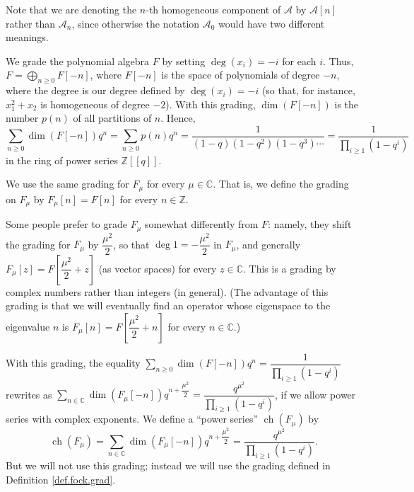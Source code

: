 \documentclass[etingof-lie.tex]{subfiles}
\begin{document}
Note that we are denoting the $n$-th homogeneous component of $\mathcal{A}$ by
$\mathcal{A}\left[  n\right]  $ rather than $\mathcal{A}_{n}$, since otherwise
the notation $\mathcal{A}_{0}$ would have two different meanings.

\begin{definition}
\label{def.fock.grad}We grade the polynomial algebra $F$ by setting
$\deg\left(  x_{i}\right)  =-i$ for each $i$. Thus, $F=\bigoplus
\limits_{n\geq0}F\left[  -n\right]  $, where $F\left[  -n\right]  $ is the
space of polynomials of degree $-n$, where the degree is our degree defined by
$\deg\left(  x_{i}\right)  =-i$ (so that, for instance, $x_{1}^{2}+x_{2}$ is
homogeneous of degree $-2$). With this grading, $\dim\left(  F\left[
-n\right]  \right)  $ is the number $p\left(  n\right)  $ of all partitions of
$n$. Hence,%
\[
\sum\limits_{n\geq0}\dim\left(  F\left[  -n\right]  \right)  q^{n}%
=\sum\limits_{n\geq0}p\left(  n\right)  q^{n}=\dfrac{1}{\left(  1-q\right)
\left(  1-q^{2}\right)  \left(  1-q^{3}\right)  \cdots}=\dfrac{1}%
{\prod\limits_{i\geq1}\left(  1-q^{i}\right)  }%
\]
in the ring of power series $\mathbb{Z}\left[  \left[  q\right]  \right]  $.

We use the same grading for $F_{\mu}$ for every $\mu\in\mathbb{C}$. That is,
we define the grading on $F_{\mu}$ by $F_{\mu}\left[  n\right]  =F\left[
n\right]  $ for every $n\in\mathbb{Z}$.
\end{definition}

\begin{remark}
\label{rmk.fockgrad}Some people prefer to grade $F_{\mu}$ somewhat differently
from $F$: namely, they shift the grading for $F_{\mu}$ by $\dfrac{\mu^{2}}{2}%
$, so that $\deg1=-\dfrac{\mu^{2}}{2}$ in $F_{\mu}$, and generally $F_{\mu
}\left[  z\right]  =F\left[  \dfrac{\mu^{2}}{2}+z\right]  $ (as vector spaces)
for every $z\in\mathbb{C}$. This is a grading by complex numbers rather than
integers (in general). (The advantage of this grading is that we will
eventually find an operator whose eigenspace to the eigenvalue $n$ is $F_{\mu
}\left[  n\right]  =F\left[  \dfrac{\mu^{2}}{2}+n\right]  $ for every
$n\in\mathbb{C}$.)

With this grading, the equality $\sum\limits_{n\geq0}\dim\left(  F\left[
-n\right]  \right)  q^{n}=\dfrac{1}{\prod\limits_{i\geq1}\left(
1-q^{i}\right)  }$ rewrites as $\sum\limits_{n\in\mathbb{C}}\dim\left(
F_{\mu}\left[  -n\right]  \right)  q^{n+\dfrac{\mu^{2}}{2}}=\dfrac{q^{\mu^{2}%
}}{\prod\limits_{i\geq1}\left(  1-q^{i}\right)  }$, if we allow power series
with complex exponents. We define a ``power series'' $\operatorname*{ch}%
\left(  F_{\mu}\right)  $ by%
\[
\operatorname*{ch}\left(  F_{\mu}\right)  =\sum\limits_{n\in\mathbb{C}}%
\dim\left(  F_{\mu}\left[  -n\right]  \right)  q^{n+\dfrac{\mu^{2}}{2}}%
=\dfrac{q^{\mu^{2}}}{\prod\limits_{i\geq1}\left(  1-q^{i}\right)  }.
\]
But we will not use this grading; instead we will use the grading defined in
Definition \ref{def.fock.grad}.
\end{remark}
\end{document}
